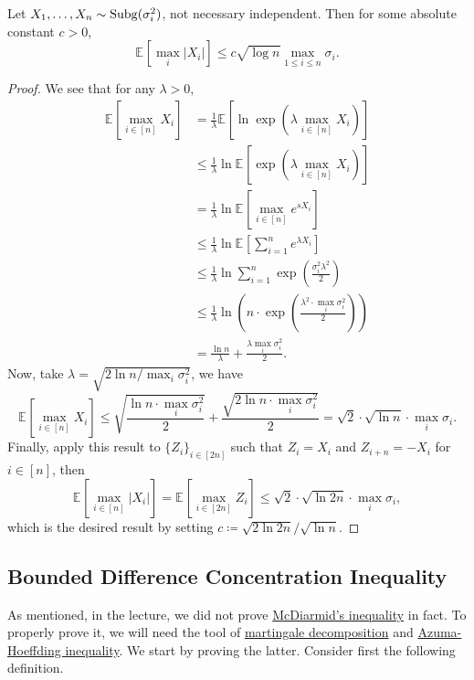 \begin{lemma}\label{pf-lma:sub-Gaussian-finite-maximum}
	Let \(X_1, \dots , X_n \sim \operatorname{Subg}(\sigma _i^{2} ) \), not necessary independent. Then for some absolute constant \(c > 0\),
	\[
		\mathbb{E}_{}\left[\max _i \vert X_i \vert \right] \leq c \sqrt{\log n} \max _{1 \leq i \leq n} \sigma _i.
	\]
\end{lemma}
\begin{proof}
	We see that for any \(\lambda > 0\),
	\begin{align*}
		\mathbb{E}_{}\left[\max _{i\in [n]} X_i\right]
		 & = \frac{1}{\lambda} \mathbb{E}_{}\left[\ln \exp \left( \lambda \max _{i\in [n]} X_i \right)  \right]                               \\
		 & \leq \frac{1}{\lambda} \ln \mathbb{E}_{}\left[\exp \left( \lambda \max _{i\in [n]} X_i \right)  \right] \tag*{Jensen's inequality} \\
		 & = \frac{1}{\lambda} \ln \mathbb{E}_{}\left[\max _{i\in [n]} e^{sX_i} \right]                                                       \\
		 & \leq \frac{1}{\lambda} \ln \mathbb{E}_{}\left[\sum_{i=1}^{n} e^{\lambda X_i} \right]                                               \\
		 & \leq \frac{1}{\lambda} \ln \sum_{i=1}^{n} \exp \left( \frac{\sigma _i^2 \lambda ^2}{2} \right)                                     \\
		 & \leq \frac{1}{\lambda } \ln \left( n\cdot \exp \left( \frac{\lambda^2\cdot \max _i \sigma _i^2}{2} \right) \right)                 \\
		 & = \frac{\ln n}{\lambda } + \frac{\lambda \max _i \sigma _i^2}{2}.
	\end{align*}
	Now, take \(\lambda = \sqrt{2 \ln n / \max _i \sigma_i^2 } \), we have
	\[
		\mathbb{E}_{}\left[\max _{i\in [n]} X_i \right]
		\leq \sqrt{\frac{\ln n \cdot \max _i \sigma _i^2}{2}} + \frac{\sqrt{2 \ln n \cdot \max _i \sigma _i^2} }{2}
		= \sqrt{2} \cdot \sqrt{\ln n} \cdot \max _i \sigma _i.
	\]
	Finally, apply this result to \(\{ Z_i \} _{i\in [2n]}\) such that \(Z_i = X_i\) and \(Z_{i+n} = -X_i\) for \(i\in [n]\), then
	\[
		\mathbb{E}_{}\left[\max _{i\in [n]} \vert X_i \vert \right]
		= \mathbb{E}_{}\left[\max _{i\in [2n]} Z_i \right]
		\leq \sqrt{2}\cdot \sqrt{\ln 2n} \cdot \max _i \sigma _i ,
	\]
	which is the desired result by setting \(c \coloneqq \sqrt{2 \ln 2n} / \sqrt{\ln n}\).
\end{proof}

\subsection{Bounded Difference Concentration Inequality}
As mentioned, in the lecture, we did not prove \hyperref[thm:McDiarmid-inequality]{McDiarmid's inequality} in fact. To properly prove it, we will need the tool of \hyperref[def:martingale-decomposition]{martingale decomposition} and \hyperref[thm:Azuma-Hoeffding-inequality]{Azuma-Hoeffding inequality}. We start by proving the latter. Consider first the following definition.

